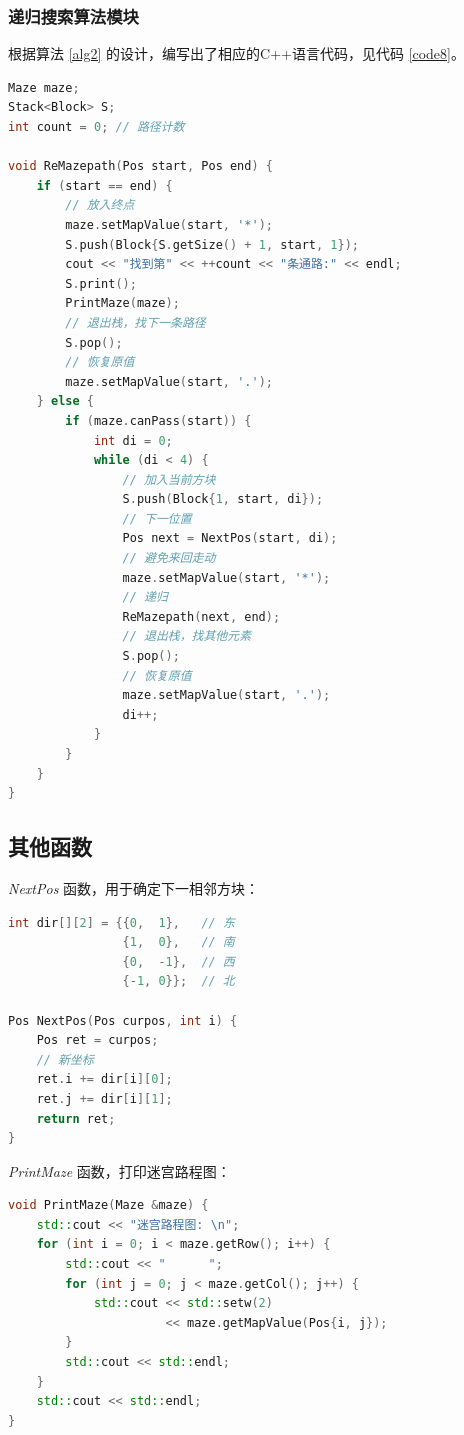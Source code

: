 \documentclass{ctexart}
\begin{document}
    \subsubsection{递归搜索算法模块}
    根据算法 \ref{alg2} 的设计，编写出了相应的C++语言代码，见代码 \ref{code8}。
\begin{lstlisting}[language=C++,caption=递归搜索算法模块代码,label=code8]
Maze maze;
Stack<Block> S;
int count = 0; // 路径计数

void ReMazepath(Pos start, Pos end) {
    if (start == end) {
        // 放入终点
        maze.setMapValue(start, '*');
        S.push(Block{S.getSize() + 1, start, 1});
        cout << "找到第" << ++count << "条通路:" << endl;
        S.print();
        PrintMaze(maze);
        // 退出栈，找下一条路径
        S.pop();
        // 恢复原值
        maze.setMapValue(start, '.');
    } else {
        if (maze.canPass(start)) {
            int di = 0;
            while (di < 4) {
                // 加入当前方块
                S.push(Block{1, start, di});
                // 下一位置
                Pos next = NextPos(start, di);
                // 避免来回走动
                maze.setMapValue(start, '*');
                // 递归
                ReMazepath(next, end);
                // 退出栈，找其他元素
                S.pop();
                // 恢复原值
                maze.setMapValue(start, '.');
                di++;
            }
        }
    }
}
\end{lstlisting}

    \subsection{其他函数}
    \emph{NextPos} 函数，用于确定下一相邻方块：
\begin{lstlisting}[language=C++,caption=NextPos函数,label=code9]
int dir[][2] = {{0,  1},   // 东
                {1,  0},   // 南
                {0,  -1},  // 西
                {-1, 0}};  // 北

Pos NextPos(Pos curpos, int i) {
    Pos ret = curpos;
    // 新坐标
    ret.i += dir[i][0];
    ret.j += dir[i][1];
    return ret;
}
\end{lstlisting}

    \emph{PrintMaze} 函数，打印迷宫路程图：
\begin{lstlisting}[language=C++,caption=PrintMaze函数,label=code10]
void PrintMaze(Maze &maze) {
    std::cout << "迷宫路程图: \n";
    for (int i = 0; i < maze.getRow(); i++) {
        std::cout << "      ";
        for (int j = 0; j < maze.getCol(); j++) {
            std::cout << std::setw(2)
                      << maze.getMapValue(Pos{i, j});
        }
        std::cout << std::endl;
    }
    std::cout << std::endl;
}
\end{lstlisting}
\end{document}
